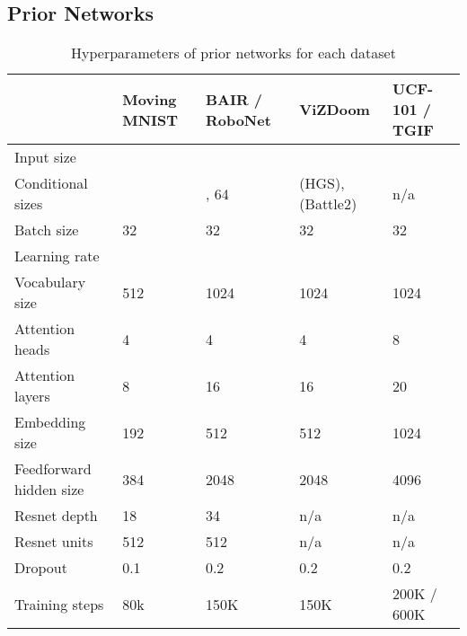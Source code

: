 \documentclass{article}
\begin{document}
\subsection{Prior Networks}

\begin{table}[h]
\caption{Hyperparameters of prior networks for each dataset}
\begin{tabular}{@{}lllll@{}}
\toprule
                                             & Moving MNIST            & BAIR / RoboNet              & ViZDoom                     & UCF-101 / TGIF          \\ \midrule
\multicolumn{1}{l|}{Input size}              &  &      &      &  \\
\multicolumn{1}{l|}{Conditional sizes}       &     & , 64 &  (HGS),  (Battle2) & n/a                     \\
\multicolumn{1}{l|}{Batch size}              & 32                      & 32                          & 32                          & 32                      \\
\multicolumn{1}{l|}{Learning rate}           &        &            &            &        \\
\multicolumn{1}{l|}{Vocabulary size}         & 512                     & 1024                        & 1024                        & 1024                    \\
\multicolumn{1}{l|}{Attention heads}         & 4                       & 4                           & 4                           & 8                       \\
\multicolumn{1}{l|}{Attention layers}        & 8                       & 16                          & 16                          & 20                      \\
\multicolumn{1}{l|}{Embedding size}          & 192                     & 512                         & 512                         & 1024                    \\
\multicolumn{1}{l|}{Feedforward hidden size} & 384                     & 2048                        & 2048                        & 4096                    \\
\multicolumn{1}{l|}{Resnet depth}            & 18                      & 34                          & n/a                         & n/a                     \\
\multicolumn{1}{l|}{Resnet units}            & 512                     & 512                         & n/a                         & n/a                     \\
\multicolumn{1}{l|}{Dropout}                 & 0.1                     & 0.2                         & 0.2                         & 0.2                     \\
\multicolumn{1}{l|}{Training steps}          & 80k                     & 150K                        & 150K                        & 200K / 600K             \\ \bottomrule
\end{tabular}
\end{table}
\clearpage
\end{document}
